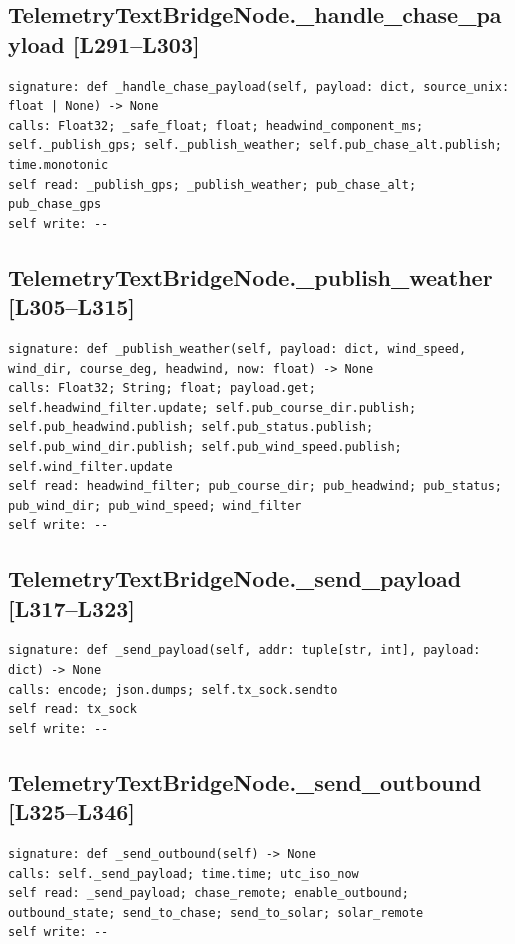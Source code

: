 \documentclass[a4paper,10pt,oneside]{book}
\begin{document}
\subsection*{TelemetryTextBridgeNode.\_handle\_chase\_payload [L291--L303]}
\begin{lstlisting}[numbers=none]
signature: def _handle_chase_payload(self, payload: dict, source_unix: float | None) -> None
calls: Float32; _safe_float; float; headwind_component_ms; self._publish_gps; self._publish_weather; self.pub_chase_alt.publish; time.monotonic
self read: _publish_gps; _publish_weather; pub_chase_alt; pub_chase_gps
self write: --
\end{lstlisting}
\subsection*{TelemetryTextBridgeNode.\_publish\_weather [L305--L315]}
\begin{lstlisting}[numbers=none]
signature: def _publish_weather(self, payload: dict, wind_speed, wind_dir, course_deg, headwind, now: float) -> None
calls: Float32; String; float; payload.get; self.headwind_filter.update; self.pub_course_dir.publish; self.pub_headwind.publish; self.pub_status.publish; self.pub_wind_dir.publish; self.pub_wind_speed.publish; self.wind_filter.update
self read: headwind_filter; pub_course_dir; pub_headwind; pub_status; pub_wind_dir; pub_wind_speed; wind_filter
self write: --
\end{lstlisting}
\subsection*{TelemetryTextBridgeNode.\_send\_payload [L317--L323]}
\begin{lstlisting}[numbers=none]
signature: def _send_payload(self, addr: tuple[str, int], payload: dict) -> None
calls: encode; json.dumps; self.tx_sock.sendto
self read: tx_sock
self write: --
\end{lstlisting}
\subsection*{TelemetryTextBridgeNode.\_send\_outbound [L325--L346]}
\begin{lstlisting}[numbers=none]
signature: def _send_outbound(self) -> None
calls: self._send_payload; time.time; utc_iso_now
self read: _send_payload; chase_remote; enable_outbound; outbound_state; send_to_chase; send_to_solar; solar_remote
self write: --
\end{lstlisting}
\end{document}

